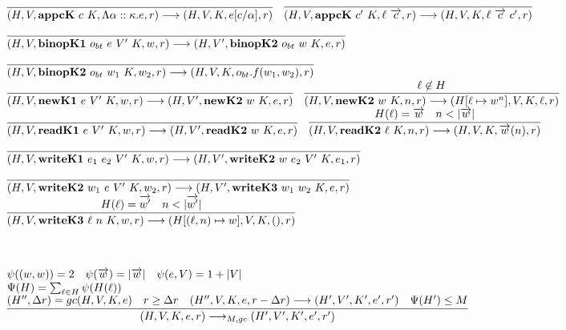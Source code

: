 \documentclass[fleqn]{article}
\begin{document}
\[\begin{array}{l}
	\infer{(H,V,\mathbf{appcK}~c~K,\Lambda \alpha::\kappa. e, r) \longrightarrow (H,V,K,e[c/\alpha],r)}{\vspace{1em}} \hspace{1em}
	\infer{(H,V,\mathbf{appcK}~c'~K,\ell~\overrightarrow{c},r) \longrightarrow (H,V,K,\ell~\overrightarrow{c}~c',r)}{\vspace{1em}} \\
	\infer{(H,V,\mathbf{binopK1}~o_{bt}~e~V'~K,w,r) \longrightarrow (H,V',\mathbf{binopK2}~o_{bt}~w~K,e,r)}{\vspace{1em}}	\\
	\infer{(H,V,\mathbf{binopK2}~o_{bt}~w_1~K,w_2,r) \longrightarrow (H,V,K,o_{bt}.f(w_1,w_2),r)}{\vspace{1em}} \\
	\infer{(H,V,\mathbf{newK1}~e~V'~K,w,r) \longrightarrow (H,V',\mathbf{newK2}~w~K,e,r)}{\vspace{1em}} \hspace{1em}
	\infer{(H,V,\mathbf{newK2}~w~K,n,r) \longrightarrow (H[\ell \mapsto w^n],V,K,\ell,r)}{\ell \not\in H} \\
	\infer{(H,V,\mathbf{readK1}~e~V'~K,w,r) \longrightarrow (H,V',\mathbf{readK2}~w~K,e,r)}{\vspace{1em}} \hspace{1em}
	\infer{(H,V,\mathbf{readK2}~\ell~K,n,r) \longrightarrow (H,V,K,\overrightarrow{w}(n),r)}{H(\ell) = \overrightarrow{w} & n < |\overrightarrow{w}|} \\
	\infer{(H,V,\mathbf{writeK1}~e_1~e_2~V'~K,w,r) \longrightarrow (H,V',\mathbf{writeK2}~w~e_2~V'~K,e_1,r)}{\vspace{1em}} \\
	\infer{(H,V,\mathbf{writeK2}~w_1~e~V'~K,w_2,r) \longrightarrow (H,V',\mathbf{writeK3}~w_1~w_2~K,e,r)}{\vspace{1em}} \\
	\infer{(H,V,\mathbf{writeK3}~\ell~n~K,w,r) \longrightarrow (H[(\ell,n) \mapsto w],V,K,(),r)}{H(\ell) = \overrightarrow{w'} & n < |\overrightarrow{w'}|} \\
	\\
	\\
	\\
	\psi((w,w)) = 2 \hspace{1em} \psi(\overrightarrow{w}) = |\overrightarrow{w}| \hspace{1em} \psi(e,V)=1+|V| \\
	\Psi(H) = \sum_{\ell \in H} \psi(H(\ell)) \\
	\infer{(H,V,K,e,r) \longrightarrow_{M,gc} (H',V',K',e',r')}{(H'',\Delta r) = gc(H,V,K,e) & r \ge \Delta r & (H'',V,K,e,r-\Delta r) \longrightarrow (H',V',K',e',r') & \Psi(H') \le M} \\

\end{array}\]
\end{document}
